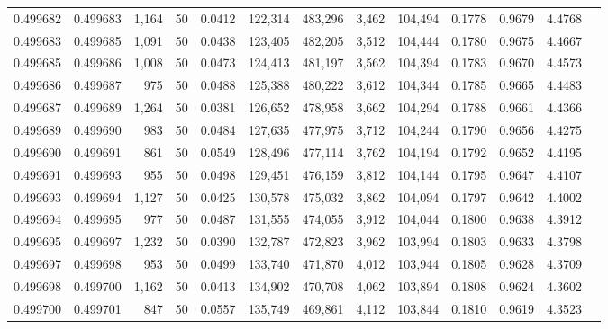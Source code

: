\begin{tabular}{rrrrrrrrrrrrr}
0.499682 & 0.499683 & 1,164 &  50 &                                     0.0412 & 122,314 & 483,296 &   3,462 & 104,494 & 0.1778 & 0.9679 & 4.4768 \\
0.499683 & 0.499685 & 1,091 &  50 &                                     0.0438 & 123,405 & 482,205 &   3,512 & 104,444 & 0.1780 & 0.9675 & 4.4667 \\
0.499685 & 0.499686 & 1,008 &  50 &                                     0.0473 & 124,413 & 481,197 &   3,562 & 104,394 & 0.1783 & 0.9670 & 4.4573 \\
0.499686 & 0.499687 &   975 &  50 &                                     0.0488 & 125,388 & 480,222 &   3,612 & 104,344 & 0.1785 & 0.9665 & 4.4483 \\
0.499687 & 0.499689 & 1,264 &  50 &                                     0.0381 & 126,652 & 478,958 &   3,662 & 104,294 & 0.1788 & 0.9661 & 4.4366 \\
0.499689 & 0.499690 &   983 &  50 &                                     0.0484 & 127,635 & 477,975 &   3,712 & 104,244 & 0.1790 & 0.9656 & 4.4275 \\
0.499690 & 0.499691 &   861 &  50 &                                     0.0549 & 128,496 & 477,114 &   3,762 & 104,194 & 0.1792 & 0.9652 & 4.4195 \\
0.499691 & 0.499693 &   955 &  50 &                                     0.0498 & 129,451 & 476,159 &   3,812 & 104,144 & 0.1795 & 0.9647 & 4.4107 \\
0.499693 & 0.499694 & 1,127 &  50 &                                     0.0425 & 130,578 & 475,032 &   3,862 & 104,094 & 0.1797 & 0.9642 & 4.4002 \\
0.499694 & 0.499695 &   977 &  50 &                                     0.0487 & 131,555 & 474,055 &   3,912 & 104,044 & 0.1800 & 0.9638 & 4.3912 \\
0.499695 & 0.499697 & 1,232 &  50 &                                     0.0390 & 132,787 & 472,823 &   3,962 & 103,994 & 0.1803 & 0.9633 & 4.3798 \\
0.499697 & 0.499698 &   953 &  50 &                                     0.0499 & 133,740 & 471,870 &   4,012 & 103,944 & 0.1805 & 0.9628 & 4.3709 \\
0.499698 & 0.499700 & 1,162 &  50 &                                     0.0413 & 134,902 & 470,708 &   4,062 & 103,894 & 0.1808 & 0.9624 & 4.3602 \\
0.499700 & 0.499701 &   847 &  50 &                                     0.0557 & 135,749 & 469,861 &   4,112 & 103,844 & 0.1810 & 0.9619 & 4.3523 \\

\end{tabular}
